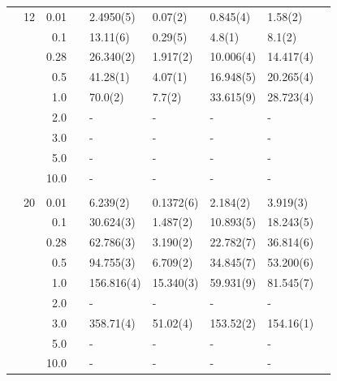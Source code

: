 \begin{table}
\begin{tabularx}{\textwidth}{R{1cm}rrcR{2.3cm}R{2.3cm}R{2.3cm}R{2.3cm}R{1cm}}
		&12 & 0.01 && 2.4950(5) & 0.07(2) & 0.845(4) & 1.58(2) \\
		&& 0.1 && 13.11(6) & 0.29(5) & 4.8(1) & 8.1(2) \\
		&& 0.28 && 26.340(2) & 1.917(2) & 10.006(4) & 14.417(4) \\
		&& 0.5 && 41.28(1) & 4.07(1) & 16.948(5) & 20.265(4) \\
		&& 1.0 && 70.0(2) & 7.7(2) & 33.615(9) & 28.723(4) \\
		&& 2.0 && - & - & - & -\\
		&& 3.0 && - & - & - & - \\ 
		&& 5.0 && - & - & - & -\\
		&& 10.0 && - & - & - & -\\
		\hdashline \\
		
		&20 & 0.01 && 6.239(2) & 0.1372(6) & 2.184(2) & 3.919(3) \\
		&& 0.1 && 30.624(3) & 1.487(2) & 10.893(5) & 18.243(5) \\
		&& 0.28 && 62.786(3) & 3.190(2) & 22.782(7) & 36.814(6) \\
		&& 0.5 && 94.755(3) & 6.709(2) & 34.845(7) & 53.200(6) \\
		&& 1.0 && 156.816(4) & 15.340(3) & 59.931(9) & 81.545(7) \\
		&& 2.0 && - & - & - & -\\
		&& 3.0 && 358.71(4) & 51.02(4) & 153.52(2) & 154.16(1) \\ 
		&& 5.0 && - & - & - & -\\
		&& 10.0 && - & - & - & -\\
		\hline\hline
	\end{tabularx}
\end{table}

